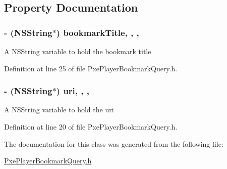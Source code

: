 \subsection{Property Documentation}
\hypertarget{interface_pxe_player_bookmark_query_a5bd099d87fc02e4872023d4755e431e3}{
\subsubsection[{bookmark\-Title}]{\setlength{\rightskip}{0pt plus 5cm}-\/ (N\-S\-String$\ast$) bookmark\-Title\hspace{0.3cm}{\ttfamily [read]}, {\ttfamily [write]}, {\ttfamily [nonatomic]}, {\ttfamily [strong]}}}\label{interface_pxe_player_bookmark_query_a5bd099d87fc02e4872023d4755e431e3}
A N\-S\-String variable to hold the bookmark title 

Definition at line 25 of file Pxe\-Player\-Bookmark\-Query.\-h.

\hypertarget{interface_pxe_player_bookmark_query_a52ea08981cbaffa901c59c4a2c855b9d}{
\subsubsection[{uri}]{\setlength{\rightskip}{0pt plus 5cm}-\/ (N\-S\-String$\ast$) uri\hspace{0.3cm}{\ttfamily [read]}, {\ttfamily [write]}, {\ttfamily [nonatomic]}, {\ttfamily [strong]}}}\label{interface_pxe_player_bookmark_query_a52ea08981cbaffa901c59c4a2c855b9d}
A N\-S\-String variable to hold the uri 

Definition at line 20 of file Pxe\-Player\-Bookmark\-Query.\-h.



The documentation for this class was generated from the following file\-:\begin{DoxyCompactItemize}
\item 
\hyperlink{_pxe_player_bookmark_query_8h}{Pxe\-Player\-Bookmark\-Query.\-h}\end{DoxyCompactItemize}
